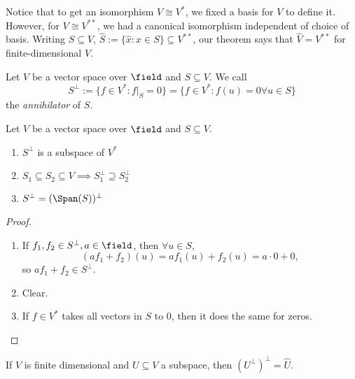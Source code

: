 \begin{remark}
Notice that to get an isomorphism $V \cong V^\ast$, we fixed a basis for $V$ to define it. However, for $V \cong V^{\ast\ast}$, we had a canonical isomorphism independent of choice of basis. Writing $S \subseteq V$, $\hat S := \{\hat{x} : x \in S\} \subseteq V^{\ast\ast}$, our theorem says that $\hat{V} = V^{\ast \ast}$ for finite-dimensional $V$.
\end{remark}

\begin{definition}[Annihilator]
    Let $V$ be a vector space over $\field$ and $S \subseteq V$. We call \[
    S^\perp := \{f \in V^\ast : f\vert_S = 0\}  = \{
        f \in V^\ast : f(u) = 0 \forall u \in S
    \}
    \]
    the \emph{annihilator} of $S$.
\end{definition}

\begin{proposition}
    Let $V$ be a vector space over $\field$ and $S \subseteq V$.
    \begin{enumerate}
        \item $S^\perp$ is a subspace of $V^\ast$\footnotemark
        \item $S_1 \subseteq S_2 \subseteq V \implies S_1^\perp \supseteq S_2^\perp$
        \item $S^\perp = (\Span(S))^\perp$
    \end{enumerate}
\end{proposition}
\begin{proof}
    \begin{enumerate}
        \item If $f_1, f_2 \in S^\perp, a \in \field$, then $\forall u \in S$, \[
        (af_1 +f_2)(u) = af_1(u) + f_2(u) = a\cdot 0 + 0,    
        \]
        so $af_1 + f_2 \in S^\perp$.
        \item Clear.
        \item If $f \in V^\ast$ takes all vectors in $S$ to $0$, then it does the same for zeros.
    \end{enumerate}
\end{proof}

\begin{proposition}
    If $V$ is finite dimensional and $U \subseteq V$ a subspace, then $(U^\perp)^\perp = \hat{U}$.
\end{proposition}

